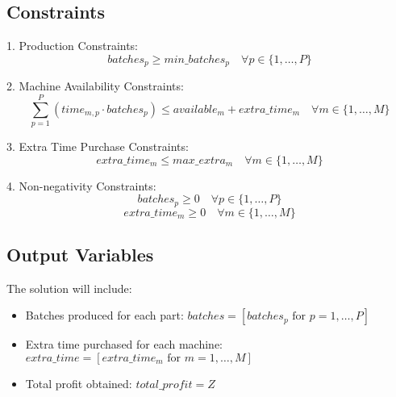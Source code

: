 \documentclass{article}
\begin{document}
\subsection*{Constraints}
1. Production Constraints:
\[
batches_p \geq min\_batches_p \quad \forall p \in \{1, \ldots, P\}
\]

2. Machine Availability Constraints:
\[
\sum_{p=1}^{P} (time_{m,p} \cdot batches_p) \leq available_m + extra\_time_m \quad \forall m \in \{1, \ldots, M\}
\]

3. Extra Time Purchase Constraints:
\[
extra\_time_m \leq max\_extra_m \quad \forall m \in \{1, \ldots, M\}
\]

4. Non-negativity Constraints:
\[
batches_p \geq 0 \quad \forall p \in \{1, \ldots, P\}
\]
\[
extra\_time_m \geq 0 \quad \forall m \in \{1, \ldots, M\}
\]

\subsection*{Output Variables}
The solution will include:
\begin{itemize}
    \item Batches produced for each part: $batches = [batches_p \text{ for } p = 1, \ldots, P]$
    \item Extra time purchased for each machine: $extra\_time = [extra\_time_m \text{ for } m = 1, \ldots, M]$
    \item Total profit obtained: $total\_profit = Z$
\end{itemize}
\end{document}
